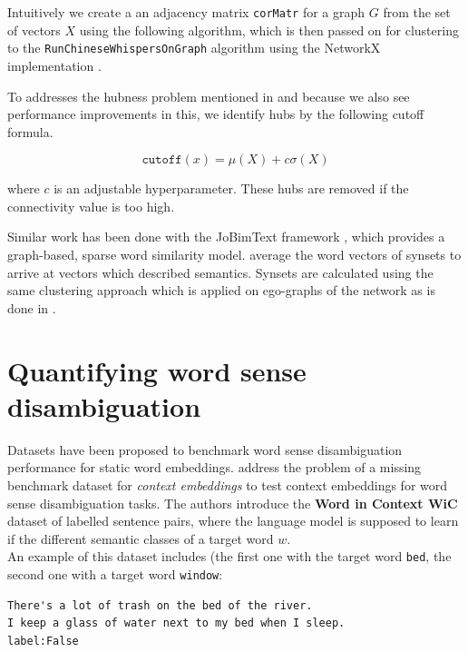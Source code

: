 \documentclass[a4paper,12pt,twoside,openright]{report}
\begin{document}
Intuitively we create a an adjacency matrix \texttt{corMatr} for a graph $G$ from the set of vectors $X$ using the following algorithm, which is then passed on for clustering to the \texttt{RunChineseWhispersOnGraph} algorithm using the NetworkX implementation \cite{hagberg04}.

To addresses the hubness problem mentioned in \cite{conneau17} and because we also see performance improvements in this, we identify hubs by the following cutoff formula.

\begin{equation}
\texttt{cutoff}(x) = \mu ( X ) + c \sigma (X)
\end{equation}

where $c$ is an adjustable hyperparameter.
These hubs are removed if the connectivity value is too high.

Similar work has been done with the JoBimText framework \cite{biemann13}, which provides a graph-based, sparse word similarity model. 
\cite{remus18} average the word vectors of synsets to arrive at vectors which described semantics.
Synsets are calculated using the same clustering approach which is applied on ego-graphs of the network as is done in \cite{biemann06}.


\section{Quantifying word sense disambiguation}

Datasets have been proposed to benchmark word sense disambiguation performance for static word embeddings\cite{bruni13, hill15}.
\cite{pilehvar19} address the problem of a missing benchmark dataset for \textit{context embeddings} to test context embeddings for word sense disambiguation tasks.
The authors introduce the \textbf{Word in Context WiC} dataset of labelled sentence pairs, where the language model is supposed to learn if the different semantic classes of a target word $w$. \\

An example of this dataset includes (the first one with the target word \Verb#bed#, the second one with a target word \Verb#window#: \\

\begin{verbatim}
There's a lot of trash on the bed of the river.
I keep a glass of water next to my bed when I sleep.
label:False
\end{verbatim}
\end{document}
